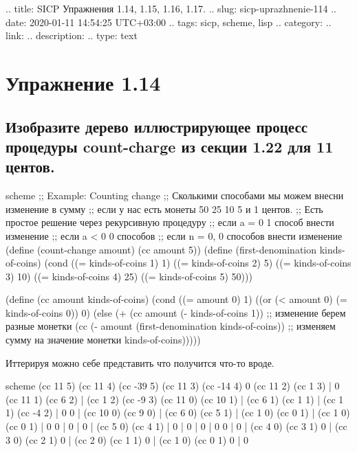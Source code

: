 .. title: SICP Упражнения 1.14, 1.15, 1.16, 1.17.
.. slug: sicp-uprazhnenie-114
.. date: 2020-01-11 14:54:25 UTC+03:00
.. tags: sicp, scheme, lisp
.. category: 
.. link: 
.. description: 
.. type: text

\chapter{Упражнение 1.14}

\section{Изобразите дерево иллюстрирующее процесс процедуры count-charge из секции 1.22 для 11 центов.}

\begin{codelisting}{scheme}
;; Example: Counting change
;; Сколькими способами мы можем внесни изменение в сумму
;; если у нас есть монеты 50 25 10 5 и 1 центов.
;; Есть простое решение через рекурсивную процедуру
;; если a = 0 1 способ внести изменение
;; если a < 0 0 способов
;; если n = 0, 0 способов внести изменение
(define (count-change amount)
  (cc amount 5))
(define (first-denomination kinds-of-coins)
  (cond ((= kinds-of-coins 1) 1)
        ((= kinds-of-coins 2) 5)
        ((= kinds-of-coins 3) 10)
        ((= kinds-of-coins 4) 25)
        ((= kinds-of-coins 5) 50)))

(define (cc amount kinds-of-coins)
  (cond ((= amount 0) 1)
        ((or (< amount 0) (= kinds-of-coins 0)) 0)
        (else (+ (cc amount
                     (- kinds-of-coins 1)) ;; изменение берем разные монетки
                 (cc (- amount
                        (first-denomination kinds-of-coins)) ;; изменяем сумму на значение монетки
                     kinds-of-coins)))))
\end{codelisting}

Иттерируя можно себе представить что получится что-то вроде.
\begin{codelisting}{scheme}
                            (cc 11 5)
                     (cc 11 4)     (cc -39 5)
                (cc 11 3) (cc -14 4)      0
           (cc 11 2) (cc 1 3) | 0
      (cc 11 1) (cc 6 2) | (cc 1 2) (cc -9 3)
 (cc 11 0) (cc 10 1) | (cc 6 1) (cc 1 1) | (cc 1 1) (cc -4 2) | 0
    0 | (cc 10 0) (cc 9 0) | (cc 6 0) (cc 5 1) | (cc 1 0) (cc 0 1) | (cc 1 0) (cc 0 1) | 0
          0 | 0 | 0 | (cc 5 0) (cc 4 1) | 0 | 0 | 0 | 0
          0 | 0 | (cc 4 0) (cc 3 1)
          0 | (cc 3 0) (cc 2 1)
          0 | (cc 2 0) (cc 1 1)
          0 | (cc 1 0) (cc 0 1)
          0 | 0
\end{codelisting}

